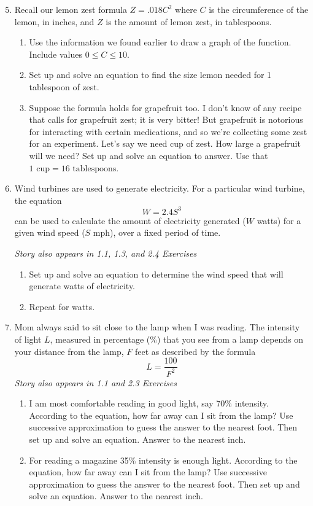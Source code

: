 \begin{enumerate} 
\setcounter{enumi}{4}

\item Recall our lemon zest formula $Z=.018C^2$ where $C$ is the circumference of the lemon, in inches, and $Z$ is the amount of lemon zest, in tablespoons.
\begin{enumerate}
\item Use the information we found earlier to draw a graph of the function.  Include values $0 \le C \le 10$. 
\item Set up and solve an equation to find the size lemon needed for 1 tablespoon of zest.
\item Suppose the formula holds for grapefruit too.  I don't know of any recipe that calls for grapefruit zest; it is very bitter!  But grapefruit is notorious for interacting with certain medications, and so we're collecting some zest for an experiment.  Let's say we need  cup of zest.  How large a grapefruit will we need?  Set up and solve an equation to answer.  Use that $1 \text{ cup} = 16 \text{ tablespoons}$.
\end{enumerate}

\item Wind turbines are used to generate electricity.  For a particular wind turbine, the equation $$W = 2.4 S^3$$ can be used to calculate the amount of electricity generated ($W$ watts) for a given wind speed ($S$ mph), over a fixed period of time.

\hfill \emph{Story also appears in 1.1, 1.3, and 2.4 Exercises}
\begin{enumerate}
\item Set up and solve an equation to determine the wind speed that will generate  watts of electricity. 
\item Repeat for  watts.
\end{enumerate}

\item Mom always said to sit close to the lamp when I was reading.  The intensity of light $L$, measured in percentage (\%) that you see from a lamp depends on your distance from the lamp, $F$ feet as described by the formula $$L=\frac{100}{F^2}$$  
\hfill \emph{Story also appears in 1.1 and 2.3 Exercises}
\begin{enumerate}
\item I am most comfortable reading in good light, say 70\% intensity.  According to the equation, how far away can I sit from the lamp?  Use successive approximation to guess the answer to the nearest  foot.  Then set up and solve an equation.   Answer to the nearest inch.  
\item For reading a magazine 35\% intensity is enough light. According to the equation, how far away can I sit from the lamp?  Use successive approximation to guess the answer to the nearest  foot.  Then set up and solve an equation.   Answer to the nearest inch.  
\end{enumerate}


\end{enumerate}
